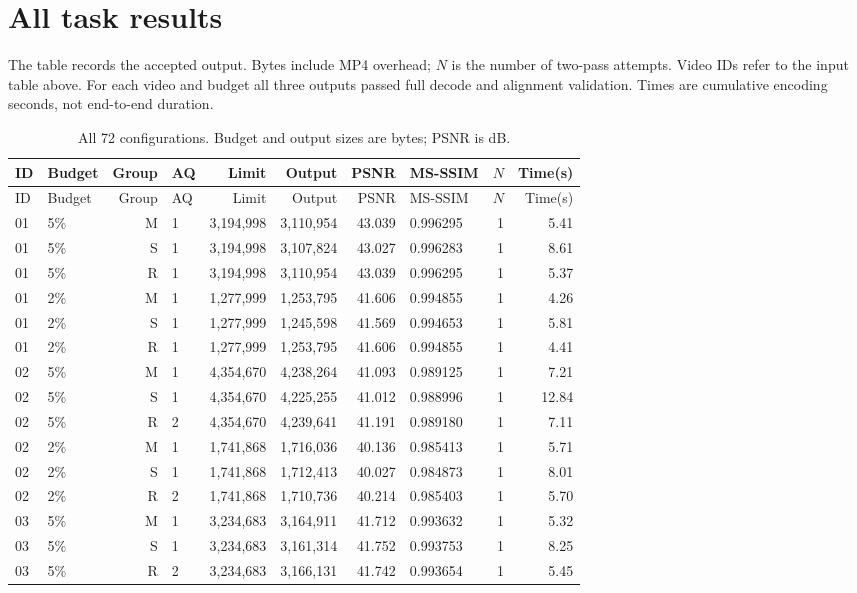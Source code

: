 \documentclass[10pt,a4paper]{article}
\begin{document}
\section{All task results}
The table records the accepted output. Bytes include MP4 overhead; $N$ is the number of two-pass attempts. Video IDs refer to the input table above. For each video and budget all three outputs passed full decode and alignment validation. Times are cumulative encoding seconds, not end-to-end duration.
\small
\begin{longtable}{llrlrrrlrr}
\caption{All 72 configurations. Budget and output sizes are bytes; PSNR is dB.}\\
\toprule ID & Budget & Group & AQ & Limit & Output & PSNR & MS-SSIM & $N$ & Time(s)\\\midrule\endfirsthead
\toprule ID & Budget & Group & AQ & Limit & Output & PSNR & MS-SSIM & $N$ & Time(s)\\\midrule\endhead
01 & 5\% & M & 1 & 3,194,998 & 3,110,954 & 43.039 & 0.996295 & 1 & 5.41 \\
01 & 5\% & S & 1 & 3,194,998 & 3,107,824 & 43.027 & 0.996283 & 1 & 8.61 \\
01 & 5\% & R & 1 & 3,194,998 & 3,110,954 & 43.039 & 0.996295 & 1 & 5.37 \\
01 & 2\% & M & 1 & 1,277,999 & 1,253,795 & 41.606 & 0.994855 & 1 & 4.26 \\
01 & 2\% & S & 1 & 1,277,999 & 1,245,598 & 41.569 & 0.994653 & 1 & 5.81 \\
01 & 2\% & R & 1 & 1,277,999 & 1,253,795 & 41.606 & 0.994855 & 1 & 4.41 \\
02 & 5\% & M & 1 & 4,354,670 & 4,238,264 & 41.093 & 0.989125 & 1 & 7.21 \\
02 & 5\% & S & 1 & 4,354,670 & 4,225,255 & 41.012 & 0.988996 & 1 & 12.84 \\
02 & 5\% & R & 2 & 4,354,670 & 4,239,641 & 41.191 & 0.989180 & 1 & 7.11 \\
02 & 2\% & M & 1 & 1,741,868 & 1,716,036 & 40.136 & 0.985413 & 1 & 5.71 \\
02 & 2\% & S & 1 & 1,741,868 & 1,712,413 & 40.027 & 0.984873 & 1 & 8.01 \\
02 & 2\% & R & 2 & 1,741,868 & 1,710,736 & 40.214 & 0.985403 & 1 & 5.70 \\
03 & 5\% & M & 1 & 3,234,683 & 3,164,911 & 41.712 & 0.993632 & 1 & 5.32 \\
03 & 5\% & S & 1 & 3,234,683 & 3,161,314 & 41.752 & 0.993753 & 1 & 8.25 \\
03 & 5\% & R & 2 & 3,234,683 & 3,166,131 & 41.742 & 0.993654 & 1 & 5.45 \\

\end{longtable}
\end{document}
